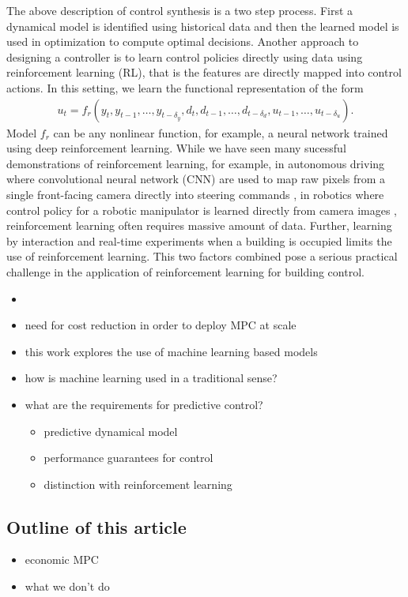 The above description of control synthesis is a two step process.
First a dynamical model is identified using historical data and then the learned model is used in optimization to compute optimal decisions.
Another approach to designing a controller is to learn control policies directly using data using reinforcement learning (RL), that is the features are directly mapped into control actions.
In this setting, we learn the functional representation of the form
\begin{align}
u_t = f_r \left( y_{t}, y_{t-1}, \dots, y_{t-\delta_y}, d_{t}, d_{t-1}, \dots, d_{t-\delta_d}, u_{t-1}, \dots, u_{t-\delta_u} \right).
\end{align}
Model \(f_r\) can be any nonlinear function, for example, a neural network trained using deep reinforcement learning.
While we have seen many sucessful demonstrations of reinforcement learning, for example, in autonomous driving where convolutional neural network (CNN) are used to map raw pixels from a single front-facing camera directly into steering commands \cite{Bojarski2016}, in robotics where control policy for a robotic manipulator is learned directly from camera images \cite{Levine2016}, reinforcement learning often requires massive amount of data.
Further, learning by interaction and real-time experiments when a building is occupied limits the use of reinforcement learning.
This two factors combined pose a serious practical challenge in the application of reinforcement learning for building control.

\begin{itemize}
	\item  
	\item need for cost reduction in order to deploy MPC at scale  
	\item this work explores the use of machine learning based models  
	\item how is machine learning used in a traditional sense?  
	\item what are the requirements for predictive control?
	\begin{itemize}
		\item predictive dynamical model
		\item performance guarantees for control
		\item distinction with reinforcement learning
	\end{itemize}
\end{itemize}

\subsection{Outline of this article}

\begin{itemize}
	\item economic MPC
	\item what we don't do
\end{itemize}